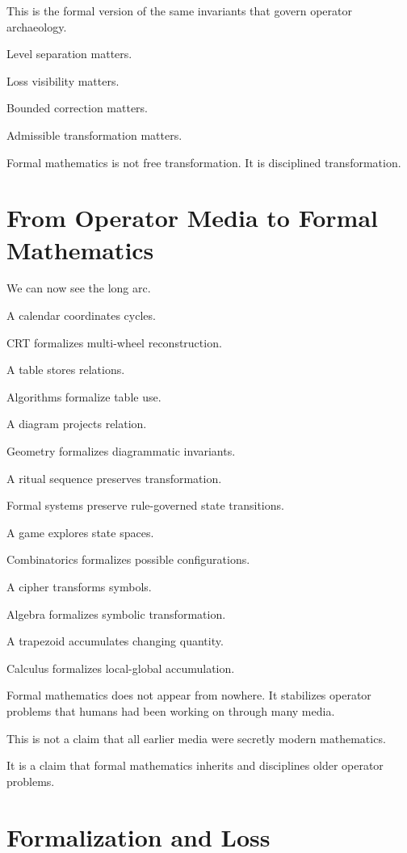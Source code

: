\documentclass[11pt]{book}
\begin{document}
This is the formal version of the same invariants that govern operator archaeology.

Level separation matters.

Loss visibility matters.

Bounded correction matters.

Admissible transformation matters.

Formal mathematics is not free transformation. It is disciplined transformation.

\section{From Operator Media to Formal Mathematics}

We can now see the long arc.

A calendar coordinates cycles.

CRT formalizes multi-wheel reconstruction.

A table stores relations.

Algorithms formalize table use.

A diagram projects relation.

Geometry formalizes diagrammatic invariants.

A ritual sequence preserves transformation.

Formal systems preserve rule-governed state transitions.

A game explores state spaces.

Combinatorics formalizes possible configurations.

A cipher transforms symbols.

Algebra formalizes symbolic transformation.

A trapezoid accumulates changing quantity.

Calculus formalizes local-global accumulation.

Formal mathematics does not appear from nowhere. It stabilizes operator problems that humans had been working on through many media.

This is not a claim that all earlier media were secretly modern mathematics.

It is a claim that formal mathematics inherits and disciplines older operator problems.

\section{Formalization and Loss}
\end{document}

